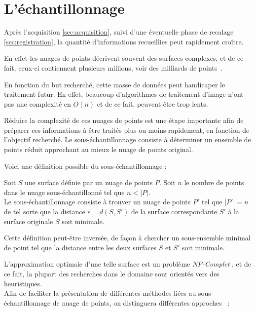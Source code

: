 \section{L'échantillonnage}

Après l'acquisition \ref{sec:acquisition}, suivi d'une éventuelle phase de recalage \ref{sec:registration}, la quantité d'informations recueillies peut rapidement croître.

En effet les nuages de points  décrivent souvent des surfaces complexes, et de ce fait, ceux-ci contiennent plusieurs millions, voir des milliards de points~\cite{Levoy}.

En fonction du but recherché, cette masse de données peut handicaper le traitement futur. En effet, beaucoup d'algorithmes de traitement d'image n'ont pas une complexité en $O(n)$ et de ce fait, peuvent être trop lents.

Réduire la complexité de ces nuages de points est une étape importante afin de préparer ces informations à être traités plus ou moins rapidement, en fonction de l'objectif recherché. Le sous-échantillonnage  consiste à déterminer un ensemble de points réduit approchant au mieux le nuage de points original.

Voici une définition possible du sous-échantillonnage \cite{Pauly2003}:

\begin{definition}
  Soit $S$ une surface définie par un nuage de points $P$. Soit $n$ le nombre de points dans le nuage sous-échantillonné tel que $n<|P|$.\\
  Le sous-échantillonnage consiste à trouver un nuage de points $P'$ tel que $|P'|=n$ de tel sorte que la distance $\epsilon = d(S,S')$ de la surface correspondante $S'$ à la surface originale $S$ soit minimale.
\end{definition}

Cette définition peut-être inversée, de façon à chercher un sous-ensemble minimal de point tel que la distance entre les deux surfaces $S$ et $S'$ soit minimale.

L'approximation optimale d'une telle surface est un problème \emph{NP-Complet} \cite{Agarwal1994}, et de ce fait, la plupart des recherches dans le domaine sont orientés vers des heuristiques.\\

Afin de faciliter la présentation de différentes méthodes liées au sous-échantillonnage de nuage de points, on distinguera différentes approches ~\cite{Pauly2002}:

